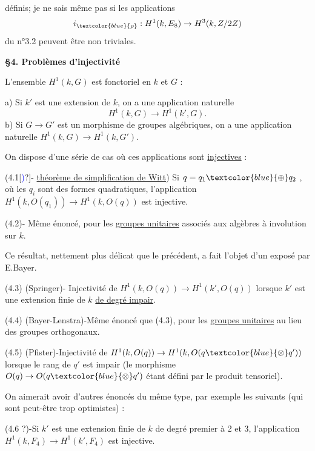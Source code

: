\documentclass[11pt]{article}
\newcommand{\scanpage}[1]{\par\bigskip\noindent{\small\sffamily[scan #1]}\par}
\newcommand{\mspage}[1]{{\small\sffamily[p.\,#1]}}
\newcommand{\hand}[1]{\textcolor{blue}{#1}}
\newcommand{\uline}[1]{\underline{#1}}
\newcommand{\unsure}[1]{[#1?]}
\begin{document}
\mspage{\hand{293}}

\clearpage
\scanpage{119/294}
\mspage{- 7 -}

définis; je ne sais même pas si les applications
\[ i_{\hand{\rho}} : H^1(k, E_8) \rightarrow H^3(k, Z/2Z) \]
du n°3.2 peuvent être non triviales.

\textbf{§4. Problèmes d'injectivité}

L'ensemble $H^1(k, G)$ est fonctoriel en $k$ et $G$ :

a) Si $k'$ est une extension de $k$, on a une application naturelle
\[ H^1(k, G) \rightarrow H^1(k', G) . \]
b) Si $G \rightarrow G'$ est un morphisme de groupes algébriques, on a une
application naturelle $H^1(k, G) \rightarrow H^1(k, G')$.

On dispose d'une série de cas où ces applications sont \uline{injectives} :

(4.1\unsure{\hand{)}}- \uline{théorème de simplification de Witt}) Si $q = q_1 \hand{\oplus} q_2$ , où les $q_i$
sont des formes quadratiques, l'application $H^1(k, O(q_1)) \rightarrow H^1(k, O(q))$
est injective.

(4.2)- Même énoncé, pour les \uline{groupes unitaires} associés aux algèbres à involution
sur $k$.

Ce résultat, nettement plus délicat que le précédent, a fait l'objet d'un
exposé par E.Bayer.

(4.3) (Springer)- Injectivité de $H^1(k, O(q)) \rightarrow H^1(k', O(q))$ lorsque
$k'$ est une extension finie de $k$ \uline{de degré impair}.

(4.4) (Bayer-Lenstra)-Même énoncé que (4.3), pour les \uline{groupes unitaires}
au lieu des groupes orthogonaux.

(4.5) (Pfister)-Injectivité de $H^1(k, O(q)) \rightarrow H^1(k, O(q \hand{\otimes} q'))$ lorsque
le rang de $q'$ est impair (le morphisme $O(q) \rightarrow O(q \hand{\otimes} q')$ étant défini
par le produit tensoriel).

On aimerait avoir d'autres énoncés du même type, par exemple les suivants
(qui sont peut-être trop optimistes) :

(4.6 ?)-Si $k'$ est une extension finie de $k$ de degré premier à 2 et
3, l'application $H^1(k, F_4) \rightarrow H^1(k', F_4)$ est injective.
\end{document}
